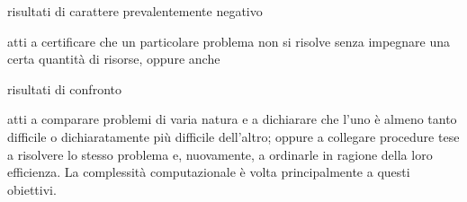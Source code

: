 \begin{center}
    risultati di carattere prevalentemente negativo
\end{center}
atti a
certificare che un particolare problema non si risolve senza impegnare una certa
quantità di risorse, oppure anche

\begin{center}
    risultati di confronto
\end{center}

atti a comparare
problemi di varia natura $\mathrm{e}$ a dichiarare che l'uno è almeno tanto
difficile o dichiaratamente più difficile dell'altro; oppure a collegare
procedure tese a risolvere lo stesso problema e, nuovamente, a ordinarle in
ragione della loro efficienza. La complessità computazionale è volta
principalmente a questi obiettivi.